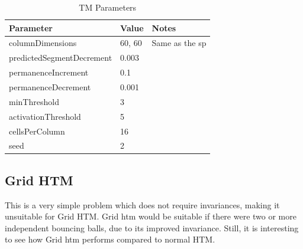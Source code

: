 \begin{table}[H]
    \centering
    \begin{tabularx}{\linewidth}{@{}llX@{}}
        \toprule
        \textbf{Parameter}        & \textbf{Value} & \textbf{Notes}        \\
        \midrule
        columnDimensions          & 60, 60         & Same as the \gls*{sp} \\
        predictedSegmentDecrement & 0.003          &                       \\
        permanenceIncrement       & 0.1            &                       \\
        permanenceDecrement       & 0.001          &                       \\
        minThreshold              & 3              &                       \\
        activationThreshold       & 5              &                       \\
        cellsPerColumn            & 16             &                       \\
        seed                      & 2              &                       \\
        \bottomrule
    \end{tabularx}

    \caption{TM Parameters}
    \label{tab:bb_TM_params}
\end{table}
\subsection{Grid HTM}
This is a very simple problem which does not require invariances, making it unsuitable for Grid HTM. Grid \gls*{htm} would be suitable if there were two or more independent bouncing balls, due to its improved invariance. Still, it is interesting to see how Grid \gls*{htm} performs compared to normal HTM.

